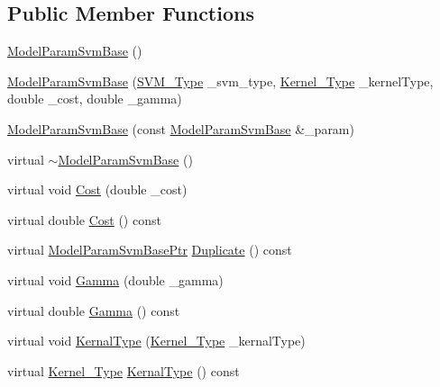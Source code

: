 \subsection*{Public Member Functions}
\begin{DoxyCompactItemize}
\item 
\hyperlink{class_k_k_m_l_l_1_1_model_param_svm_base_a20408047e2d1914b1142bdb61a428a94}{Model\+Param\+Svm\+Base} ()
\item 
\hyperlink{class_k_k_m_l_l_1_1_model_param_svm_base_aa0d301b0b3239ffa7fa0ada9835fa756}{Model\+Param\+Svm\+Base} (\hyperlink{namespace_s_v_m289___m_f_s_ace392faef6440cf56ebff6b360e7d72a}{S\+V\+M\+\_\+\+Type} \+\_\+svm\+\_\+type, \hyperlink{namespace_s_v_m289___m_f_s_ad985d190115342f6434e0ed8816b6e29}{Kernel\+\_\+\+Type} \+\_\+kernel\+Type, double \+\_\+cost, double \+\_\+gamma)
\item 
\hyperlink{class_k_k_m_l_l_1_1_model_param_svm_base_a6321b50611f65ae4ad0a8e5642b23b0d}{Model\+Param\+Svm\+Base} (const \hyperlink{class_k_k_m_l_l_1_1_model_param_svm_base}{Model\+Param\+Svm\+Base} \&\+\_\+param)
\item 
virtual \hyperlink{class_k_k_m_l_l_1_1_model_param_svm_base_a268c1e49483cbb628d431e10479ec39d}{$\sim$\+Model\+Param\+Svm\+Base} ()
\item 
virtual void \hyperlink{class_k_k_m_l_l_1_1_model_param_svm_base_a789aab0b698244d513a922fcbc3c8ff3}{Cost} (double \+\_\+cost)
\item 
virtual double \hyperlink{class_k_k_m_l_l_1_1_model_param_svm_base_af330a8c4bc75498b6ec4f44de5e33f00}{Cost} () const 
\item 
virtual \hyperlink{class_k_k_m_l_l_1_1_model_param_svm_base_a5ad5361c21775170f41e908b5bf924d0}{Model\+Param\+Svm\+Base\+Ptr} \hyperlink{class_k_k_m_l_l_1_1_model_param_svm_base_a842df60200522b2356ab24a22531fd5b}{Duplicate} () const 
\item 
virtual void \hyperlink{class_k_k_m_l_l_1_1_model_param_svm_base_a69e39030fbc034ca005bce629a0f2d6f}{Gamma} (double \+\_\+gamma)
\item 
virtual double \hyperlink{class_k_k_m_l_l_1_1_model_param_svm_base_a17f748987931cb1048b79a55e906b002}{Gamma} () const 
\item 
virtual void \hyperlink{class_k_k_m_l_l_1_1_model_param_svm_base_aaa5bab312290229080771f3d862927cb}{Kernal\+Type} (\hyperlink{namespace_s_v_m289___m_f_s_ad985d190115342f6434e0ed8816b6e29}{Kernel\+\_\+\+Type} \+\_\+kernal\+Type)
\item 
virtual \hyperlink{namespace_s_v_m289___m_f_s_ad985d190115342f6434e0ed8816b6e29}{Kernel\+\_\+\+Type} \hyperlink{class_k_k_m_l_l_1_1_model_param_svm_base_a5429dc026764980ed8f94ea5be64cc12}{Kernal\+Type} () const 

\end{DoxyCompactItemize}
